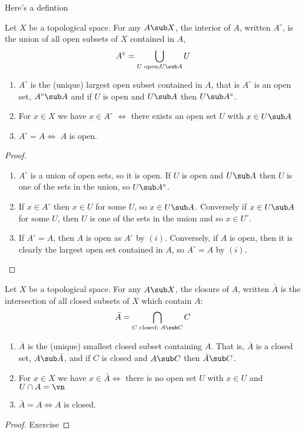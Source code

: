 Here's a defintion
\begin{ndefi}[Interior]
  Let $X$ be a topological space. For any $A \sub X$, the interior of $A$, written $A^\circ$, is the union of all open subsets of $X$ contained in $A$,
  $$ A^\circ = \bigcup_{U \text{ open;} U \sub A} U $$
\end{ndefi}

\begin{nprop}
   \begin{enumerate}
     \item $A^\circ$ is the (unique) largest open subset contained in $A$, that is $A^\circ$ is an open set, $A^\circ \sub A$ and if $U$ is open and $U \sub A$ then $U \sub A^\circ$.
     \item For $x \in X$ we have $x \in A^\circ$ $\iff$ there exists an open set $U$ with $x \in U \sub A$
     \item $A^\circ = A \iff$ $A$ is open.
   \end{enumerate}
\end{nprop}
\begin{proof}
  \begin{enumerate}
    \item $A^\circ$ is a union of open sets, so it is open. If $U$ is open and $U \sub A$ then $U$ is one of the sets in the union, so $U \sub A^\circ$.
    \item If $x \in A^\circ$ then $x \in U$ for some $U$, so $x \in U \sub A$. Conversely if $x \in U \sub A$ for some $U$, then $U$ is one of the sets in the union and so $x \in U^\circ$.
    \item If $A^\circ = A$, then $A$ is open as $A^\circ$ by $(i)$. Conversely, if $A$ is open, then it is clearly the largest open set contained in $A$, so $A^\circ = A$ by $(i)$.
  \end{enumerate}
\end{proof}

\begin{ndefi}[Closure]
  Let $X$ be a topological space. For any $A \sub X$, the closure of $A$, written $\bar A$ is the intersection of all closed subsets of $X$ which contain $A$:
  $$ \bar A = \bigcap_{C \text{ closed; } A \sub C} C $$
\end{ndefi}
\begin{nprop}
 \begin{enumerate}
   \item $\bar A$ is the (unique) smallest closed subset containing $A$. That is, $\bar A$ is a closed set, $A \sub \bar A$, and if $C$ is closed and $A\sub C$ then $\bar A \sub C$.
   \item For $x \in X$ we have $x \in \bar A \iff$ there is no open set $U$ with $x \in U$ and $U \cap A = \vn$
   \item $\bar A = A \iff A$ is closed.
 \end{enumerate}
\end{nprop}
\begin{proof}
  Exercise
\end{proof}

